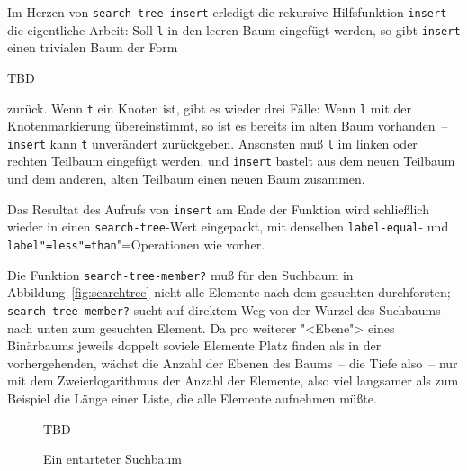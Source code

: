%
Im Herzen von \texttt{search-tree-insert} erledigt die rekursive
Hilfsfunktion \texttt{insert} die eigentliche Arbeit: Soll
\texttt{l} in den leeren Baum eingefügt werden, so gibt
\texttt{insert} einen trivialen Baum der Form
%

TBD

% 
zurück.  Wenn \texttt{t} ein Knoten ist, gibt es wieder drei Fälle:
Wenn \texttt{l} mit der
Knotenmarkierung übereinstimmt, so ist es bereits im alten Baum
vorhanden~-- \texttt{insert} kann \texttt{t} unverändert
zurückgeben.  Ansonsten muß
\texttt{l} im linken oder rechten Teilbaum eingefügt werden,
und \texttt{insert} bastelt aus dem neuen Teilbaum und dem anderen, alten Teilbaum
einen neuen Baum zusammen.

Das Resultat des Aufrufs von \texttt{insert} am Ende der Funktion wird
schließlich wieder in einen \texttt{search-tree}-Wert eingepackt,
mit denselben \texttt{label-equal}- und \texttt{label"=less"=than}"=Operationen wie vorher.

Die Funktion \texttt{search-tree-member?} muß für den Suchbaum in
Abbildung~\ref{fig:searchtree} nicht alle Elemente nach dem gesuchten
durchforsten; \texttt{search-tree-member?} sucht auf direktem Weg
von der Wurzel des Suchbaums nach unten zum gesuchten Element.  Da pro
weiterer "<Ebene"> eines Binärbaums jeweils doppelt soviele Elemente
Platz finden als in der vorhergehenden, wächst die Anzahl der Ebenen
des Baums~-- die Tiefe also~-- nur mit dem Zweierlogarithmus der
Anzahl der Elemente, also viel langsamer als zum Beispiel die Länge
einer Liste, die alle Elemente aufnehmen müßte.

\begin{figure}[tb]
  TBD
     \caption{Ein entarteter Suchbaum}
     \label{fig:stupid-searchtree}
\end{figure}

